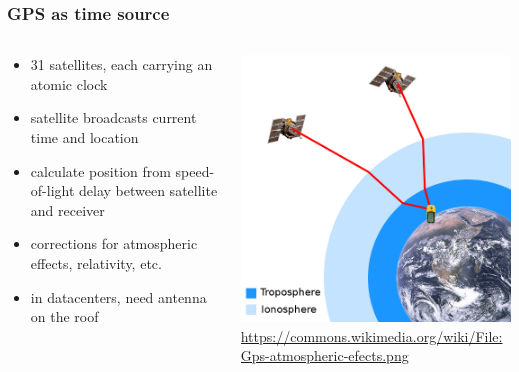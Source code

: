 \begin{frame}
    \label{s:gps-time}
    \frametitle{GPS as time source}
    \begin{columns}
        \begin{column}{0.5\textwidth}
            \begin{itemize}
                \item 31 satellites, each carrying an atomic clock
                \item satellite broadcasts current time and location
                \item calculate position from speed-of-light delay between satellite and receiver
                \item corrections for atmospheric effects, relativity, etc.
                \item in datacenters, need antenna on the roof
            \end{itemize}
        \end{column}
        \begin{column}{0.5\textwidth}
            \includegraphics[width=\textwidth]{images/gps-satellites.png}\\[1em]
            \scriptsize\url{https://commons.wikimedia.org/wiki/File:Gps-atmospheric-efects.png}
        \end{column}
    \end{columns}
\end{frame}
\label{l:gps-time}


